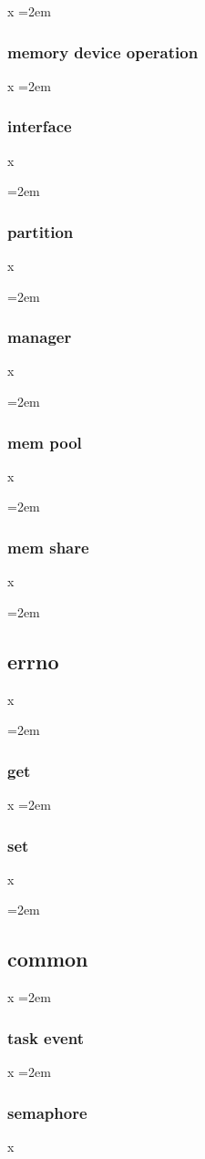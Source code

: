 \documentclass[a4paper]{article}
\let\oldsubsection\subsection
\renewcommand{\subsection}{\leftskip=2em \oldsubsection}
\let\oldsubsubsection\subsubsection
\renewcommand{\subsubsection}{\leftskip=2em \oldsubsubsection}
\begin{document}
x
\subsubsection{memory device operation}

x
\subsubsection{interface}
x

\subsubsection{partition}
x

\subsubsection{manager}
x

\subsubsection{mem pool}
x

\subsubsection{mem share}

x

\subsection{errno}
x

\subsubsection{get}

x
\subsubsection{set}
x


\subsection{common}

x
\subsubsection{task event}

x
\subsubsection{semaphore}
x
\end{document}
